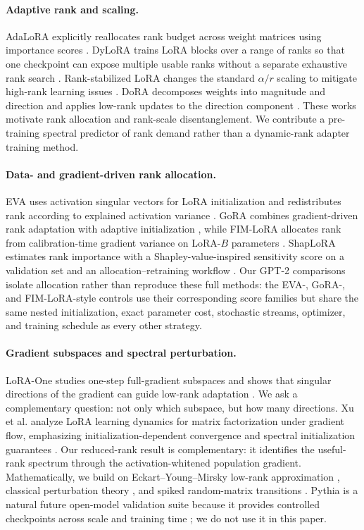 \documentclass[10pt,twocolumn]{article}
\theoremstyle{definition}
\begin{document}
\paragraph{Adaptive rank and scaling.}
AdaLoRA explicitly reallocates rank budget across weight matrices using importance scores \cite{zhang2023adalora}.  DyLoRA trains LoRA blocks over a range of ranks so that one checkpoint can expose multiple usable ranks without a separate exhaustive rank search \cite{valipour2023dylora}.  Rank-stabilized LoRA changes the standard $\alpha/r$ scaling to mitigate high-rank learning issues \cite{kalajdzievski2023rslora}.  DoRA decomposes weights into magnitude and direction and applies low-rank updates to the direction component \cite{liu2024dora}.  These works motivate rank allocation and rank-scale disentanglement.  We contribute a pre-training spectral predictor of rank demand rather than a dynamic-rank adapter training method.

\paragraph{Data- and gradient-driven rank allocation.}
EVA uses activation singular vectors for LoRA initialization and redistributes rank according to explained activation variance \cite{paischer2025eva}.  GoRA combines gradient-driven rank adaptation with adaptive initialization \cite{he2025gora}, while FIM-LoRA allocates rank from calibration-time gradient variance on LoRA-$B$ parameters \cite{sathyavageeswaran2026fimlora}.  ShapLoRA estimates rank importance with a Shapley-value-inspired sensitivity score on a validation set and an allocation--retraining workflow \cite{zhao2026shaplora}.  Our GPT-2 comparisons isolate allocation rather than reproduce these full methods: the EVA-, GoRA-, and FIM-LoRA-style controls use their corresponding score families but share the same nested initialization, exact parameter cost, stochastic streams, optimizer, and training schedule as every other strategy.

\paragraph{Gradient subspaces and spectral perturbation.}
LoRA-One studies one-step full-gradient subspaces and shows that singular directions of the gradient can guide low-rank adaptation \cite{zhang2025loraone}.  We ask a complementary question: not only which subspace, but how many directions.  Xu et al. analyze LoRA learning dynamics for matrix factorization under gradient flow, emphasizing initialization-dependent convergence and spectral initialization guarantees \cite{xu2025loradynamics}.  Our reduced-rank result is complementary: it identifies the useful-rank spectrum through the activation-whitened population gradient.  Mathematically, we build on Eckart--Young--Mirsky low-rank approximation \cite{eckart1936approximation,mirsky1960symmetric}, classical perturbation theory \cite{davis1970rotation}, and spiked random-matrix transitions \cite{benaych2012singular}.  Pythia is a natural future open-model validation suite because it provides controlled checkpoints across scale and training time \cite{biderman2023pythia}; we do not use it in this paper.
\end{document}
